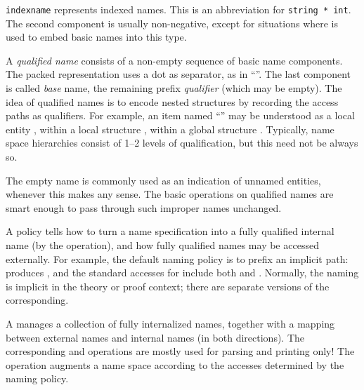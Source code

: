 \begin{isabellebody}
\begin{isamarkuptext}
  \begin{description}

  \item \verb|indexname| represents indexed names.  This is an
  abbreviation for \verb|string * int|.  The second component is
  usually non-negative, except for situations where 
  is used to embed basic names into this type.

  \end{description}%
\end{isamarkuptext}%
\isamarkuptrue%
%
\endisatagmlref
{\isafoldmlref}%
%
\isadelimmlref
%
\endisadelimmlref
%
\isamarkuptrue%
%
\begin{isamarkuptext}%
A \emph{qualified name} consists of a non-empty sequence of basic
  name components.  The packed representation uses a dot as separator,
  as in ``''.  The last component is called \emph{base}
  name, the remaining prefix \emph{qualifier} (which may be empty).
  The idea of qualified names is to encode nested structures by
  recording the access paths as qualifiers.  For example, an item
  named ``'' may be understood as a local entity , within a local structure , within a global
  structure .  Typically, name space hierarchies consist of
  1--2 levels of qualification, but this need not be always so.

  The empty name is commonly used as an indication of unnamed
  entities, whenever this makes any sense.  The basic operations on
  qualified names are smart enough to pass through such improper names
  unchanged.

  \medskip A  policy tells how to turn a name
  specification into a fully qualified internal name (by the  operation), and how fully qualified names may be accessed
  externally.  For example, the default naming policy is to prefix an
  implicit path:  produces , and the
  standard accesses for  include both  and
  .  Normally, the naming is implicit in the theory or
  proof context; there are separate versions of the corresponding.

  \medskip A  manages a collection of fully
  internalized names, together with a mapping between external names
  and internal names (in both directions).  The corresponding  and  operations are mostly used for
  parsing and printing only!  The  operation augments
  a name space according to the accesses determined by the naming
  policy.


\end{isamarkuptext}
\end{isabellebody}
